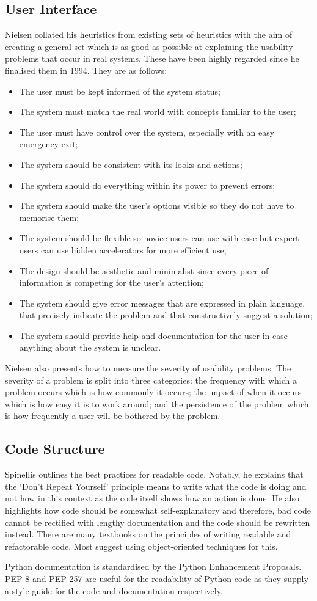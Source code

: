 		\subsection{User Interface}
			Nielsen collated his heuristics from existing sets of heuristics with the aim of creating a general set which is as good as possible at explaining the usability problems that occur in real systems\cite{usability_heuristics_nielsen}. These have been highly regarded since he finalised them in 1994. They are as follows: 
			\begin{itemize}
				\item The user must be kept informed of the system status;
				\item The system must match the real world with concepts familiar to the user;  
				\item The user must have control over the system, especially with an easy emergency exit; 
				\item The system should be consistent with its looks and actions;
				\item The system should do everything within its power to prevent errors;
				\item The system should make the user's options visible so they do not have to memorise them;
				\item The system should be flexible so novice users can use with ease but expert users can use hidden accelerators for more efficient use;
				\item The design should be aesthetic and minimalist since every piece of information is competing for the user's attention;
				\item The system should give error messages that are expressed in plain language, that precisely indicate the problem and that constructively suggest a solution;
				\item The system should provide help and documentation for the user in case anything about the system is unclear. 
			\end{itemize}

			Nielsen also presents how to measure the severity of usability problems. The severity of a problem is split into three categories: the frequency with which a problem occurs which is how commonly it occurs; the impact of when it occurs which is how easy it is to work around; and the persistence of the problem which is how frequently a user will be bothered by the problem. 
		\subsection{Code Structure}
			Spinellis outlines the best practices for readable code\cite{code_documentation_spinellis}. Notably, he explains that the `Don't Repeat Yourself' principle means to write what the code is doing and not how in this context as the code itself shows how an action is done. He also highlights how code should be somewhat self-explanatory and therefore, bad code cannot be rectified with lengthy documentation and the code should be rewritten instead. There are many textbooks on the principles of writing readable and refactorable code. Most suggest using object-oriented techniques for this\cite{software_craftsmanship_martin}.  

			Python documentation is standardised by the Python Enhancement Proposals. PEP 8 and PEP 257 are useful for the readability of Python code as they supply a style guide for the code and documentation respectively\cite{pep_guido}. 